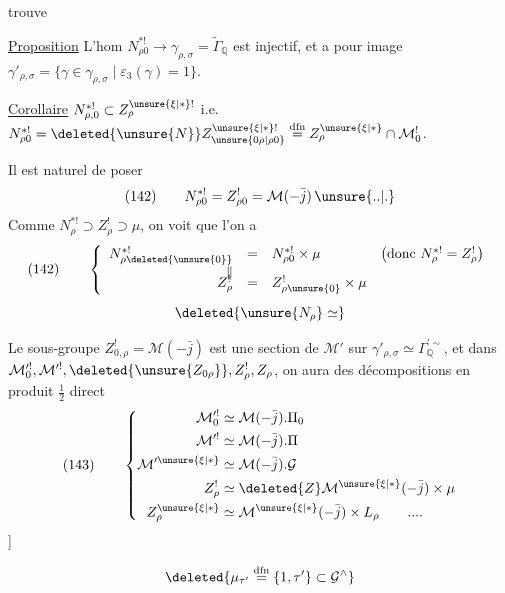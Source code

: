 
trouve

\uline{Proposition} L'hom
$N_{\rho0}^{*!}\longrightarrow\gamma_{\rho,\sigma}=\widetilde\Gamma_{\mathbb Q}$
est injectif, et a pour image
$\gamma'_{\rho,\sigma}=\{\gamma\in\gamma_{\rho,\sigma}\mid\varepsilon_3(\gamma)=1\}$.

\uline{Corollaire}
$N_{\rho,0}^{*!}\subset Z_{\rho}^{\unsure{\xi|*}!}$ i.e.
$N_{\rho0}^{*!}=\deleted{\unsure{N}}Z_{\unsure{0\rho|\rho0}}^{\unsure{\xi|*}!}
 \overset{\mathrm{dfn}}{=}Z_{\rho}^{\unsure{\xi|*}}\cap\mathcal M_0^!$.

Il est naturel de poser
\[
 (142)\qquad N_{\rho0}^{*!}=Z_{\rho0}^!=\mathcal M(-\bar j)\,\unsure{..|.}
\]
Comme $N_{\rho}^{*!}\supset Z_{\rho}^!\supset\mu$, on voit que l'on a
\[
 (142)\qquad
 \left\{\begin{array}{rcll}
 N_{\rho\deleted{\unsure{0}}}^{*!}&=&N_{\rho0}^{*!}\times\mu
     &\bigl(\text{donc }N_{\rho}^{*!}=Z_{\rho}^!\bigr)\\
 \Vert&&&\\[-1ex]
 Z_{\rho}^!&=&Z_{\rho\unsure{0}}^!\times\mu&
 \end{array}\right.
\]
\[
 \deleted{\unsure{N_{\rho}}\simeq}
\]

Le sous-groupe $Z^!_{0,\rho}=\mathcal M(-\bar j)$ est une section de
$\mathcal M'$ sur $\gamma'_{\rho,\sigma}\simeq\Gamma_{\mathbb Q}^{\prime\sim}$,
et  
 dans
$\mathcal M_0^{\prime!},\mathcal M^{\prime!},
 \deleted{\unsure{Z_{0\rho}}},Z_{\rho}^!,Z_{\rho}$,
on aura des décompositions en produit $\frac12$ direct
\[
 (143)\qquad
 \left\{\begin{aligned}
 \mathcal M_0^{\prime!}&\simeq\mathcal M(-\bar j).\Pi_0\\
 \mathcal M^{\prime!}&\simeq\mathcal M(-\bar j).\Pi\\
 \mathcal M^{\prime\unsure{\xi|*}}&\simeq\mathcal M(-\bar j).\mathcal G\\
 Z_{\rho}^!&\simeq\deleted{Z}\mathcal M^{\unsure{\xi|*}}(-\bar j)\times\mu\\
 Z_{\rho}^{\unsure{\xi|*}}&\simeq\mathcal M^{\unsure{\xi|*}}(-\bar j)\times L_{\rho}
 \qquad ....
 \end{aligned}\right.
\]
]

\[
 \deleted{\mu_{\tau'}\overset{\mathrm{dfn}}{=}\{1,\tau'\}\subset\mathcal G^{\wedge}}
\]

